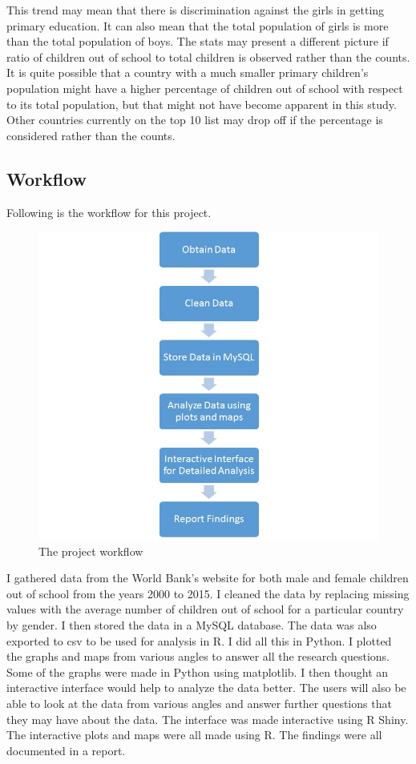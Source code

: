 \documentclass{article}
\begin{document}
This trend may mean that there is discrimination against the girls in getting primary education. It can also mean that the total population of girls is more than the total population of boys. The stats may present a different picture if ratio of children out of school to total children is observed rather than the counts. It is quite possible that a country with a much smaller primary children’s population might have a higher percentage of children out of school with respect to its total population, but that might not have become apparent in this study. Other countries currently on the top 10 list may drop off if the percentage is considered rather than the counts.

\subsection{Workflow}

Following is the workflow for this project.



\begin{figure}[H]
  \centering
    \includegraphics[scale=1.5]{workflow}
  \caption{The project workflow}

\end{figure}


I gathered data from the World Bank’s website for both male and female children out of school from the years 2000 to 2015. I cleaned the data by replacing missing values with the average number of children out of school for a particular country by gender. I then stored the data in a MySQL database. The data was also exported to csv to be used for analysis in R. I did all this in Python. I plotted the graphs and maps from various angles to answer all the research questions. Some of the graphs were made in Python using matplotlib. I then thought an interactive interface would help to analyze the data better. The users will also be able to look at the data from various angles and answer further questions that they may have about the data. The interface was made interactive using R Shiny. The interactive plots and maps were all made using R. The findings were all documented in a report.
\end{document}
